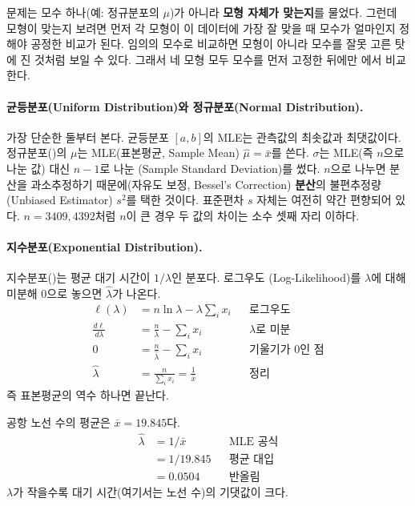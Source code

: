 문제는 모수 하나(예: 정규분포의 $\mu$)가 아니라 \textbf{모형 자체가 맞는지}를 물었다.
그런데 모형이 맞는지 보려면 먼저 각 모형이 이 데이터에 가장 잘 맞을 때 모수가 얼마인지
정해야 공정한 비교가 된다. 임의의 모수로 비교하면 모형이 아니라 모수를 잘못 고른
탓에 진 것처럼 보일 수 있다. 그래서 네 모형 모두 모수를 먼저 고정한 뒤에만
에서 비교한다.

\paragraph{균등분포(Uniform Distribution)와 정규분포(Normal Distribution).}
가장 단순한 둘부터 본다. 균등분포 $[a, b]$의 MLE는 관측값의 최솟값과 최댓값이다.
정규분포()의 $\mu$는 MLE(표본평균, Sample Mean) $\hat\mu = \bar x$를
쓴다. $\sigma$는 MLE(즉 $n$으로 나눈 값) 대신 $n-1$로 나눈 (Sample
Standard Deviation)를 썼다. $n$으로 나누면 분산을 과소추정하기 때문에(자유도 보정,
Bessel's Correction) \textbf{분산}의 불편추정량(Unbiased Estimator) $s^2$를 택한 것이다.
표준편차 $s$ 자체는 여전히 약간 편향되어 있다. $n=3409, 4392$처럼 $n$이 큰 경우
두 값의 차이는 소수 셋째 자리 이하다.

\paragraph{지수분포(Exponential Distribution).}
지수분포()는 평균 대기 시간이 $1/\lambda$인 분포다. 로그우도
(Log-Likelihood)를 $\lambda$에 대해 미분해 0으로 놓으면 $\hat\lambda$가 나온다.
\begin{align*}
  \ell(\lambda) &= n\ln\lambda - \lambda\sum_i x_i   && \text{로그우도}\\
  \frac{d\ell}{d\lambda} &= \frac{n}{\lambda} - \sum_i x_i  && \text{$\lambda$로 미분}\\
  0 &= \frac{n}{\hat\lambda} - \sum_i x_i  && \text{기울기가 0인 점}\\
  \hat\lambda &= \frac{n}{\sum_i x_i} = \frac{1}{\bar x}   && \text{정리}
\end{align*}
즉 표본평균의 역수 하나면 끝난다.

\begin{example}
\label{ex:hw2-exp-mle}
공항 노선 수의 평균은 $\bar x = 19.845$다.
\begin{align*}
  \hat\lambda &= 1/\bar x                 && \text{MLE 공식}\\
              &= 1/19.845                 && \text{평균 대입}\\
              &= 0.0504                   && \text{반올림}
\end{align*}
$\lambda$가 작을수록 대기 시간(여기서는 노선 수)의 기댓값이 크다.
\end{example}

